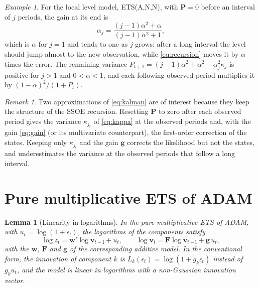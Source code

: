 \documentclass[11pt,a4paper]{article}
\newcommand{\vect}[1]{\mathbf{#1}}
\newtheorem{lemma}{Lemma}
\theoremstyle{remark}
\newtheorem{remark}{Remark}
\newtheorem{example}{Example}
\begin{document}
\begin{example}
For the local level model, ETS(A,N,N), with $\vect P = 0$ before an interval of $j$ periods, the
gain at its end is
\begin{equation}
\alpha_j = \frac{(j-1)\alpha^2 + \alpha}{(j-1)\alpha^2 + 1},
\label{eq:gain}
\end{equation}
which is $\alpha$ for $j = 1$ and tends to one as $j$ grows: after a long interval the level should
jump almost to the new observation, while \eqref{eq:recursion} moves it by $\alpha$ times the error.
The remaining variance $P_{t+1} = (j-1)\alpha^2 + \alpha^2 - \alpha_j^2\kappa_j$ is positive for
$j > 1$ and $0<\alpha<1$, and each following observed period multiplies it by
$(1-\alpha)^2/(1+P_t)$.
\end{example}

\begin{remark}
Two approximations of \eqref{eq:kalman} are of interest because they keep the structure of the
SSOE recursion. Resetting $\vect P$ to zero after each observed period gives the variance
$\kappa_{j_t}$ of \eqref{eq:kappa} at the observed periods and, with the gain \eqref{eq:gain} (or
its multivariate counterpart), the first-order correction of the states. Keeping only $\kappa_{j_t}$
and the gain $\vect g$ corrects the likelihood but not the states, and underestimates the variance
at the observed periods that follow a long interval.
\end{remark}

\section{Pure multiplicative ETS of ADAM}
\label{sec:multiplicative}

\begin{lemma}[Linearity in logarithms]
\label{lem:loglinear}
In the pure multiplicative ETS of ADAM, with $u_t = \log(1+\epsilon_t)$, the logarithms of the
components satisfy
\begin{equation}
\log z_t = \vect w'\log\vect v_{t-\vect l} + u_t, \qquad
\log\vect v_t = \vect F\log\vect v_{t-\vect l} + \vect g\,u_t ,
\label{eq:loglinear}
\end{equation}
with the $\vect w$, $\vect F$ and $\vect g$ of the corresponding additive model. In the conventional
form, the innovation of component $k$ is $L_k(\epsilon_t) = \log(1+g_k\epsilon_t)$ instead of
$g_k u_t$, and the model is linear in logarithms with a non-Gaussian innovation vector.
\end{lemma}
\end{document}
